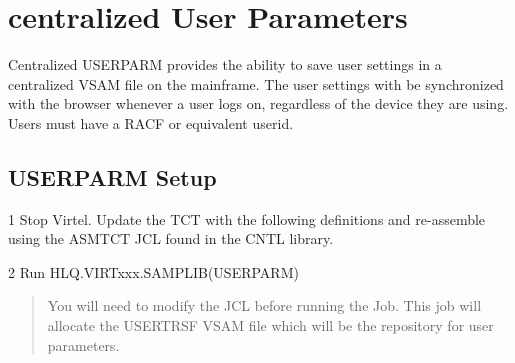 \documentclass[letterpaper,10pt,english]{sphinxmanual}
\begin{document}
\ignorespaces 

\chapter{centralized User Parameters}
\label{\detokenize{Customization:centralized-user-parameters}}\label{\detokenize{Customization:index-95}}
Centralized USERPARM provides the ability to save user settings in a centralized VSAM file on the mainframe. The user settings with be synchronized with the browser whenever a user logs on, regardless of the device they are using. Users must have a RACF or equivalent userid.


\section{USERPARM Setup}
\label{\detokenize{Customization:userparm-setup}}
1   Stop Virtel. Update the TCT with the following definitions and re-assemble using the ASMTCT JCL found in the CNTL library.
\begin{quote}

\begin{sphinxVerbatim}[commandchars=\\\{\}]
                                              
                                
            
\end{sphinxVerbatim}
\end{quote}

2   Run HLQ.VIRTxxx.SAMPLIB(USERPARM)
\begin{quote}

You will need to modify the JCL before running the Job. This job will allocate the USERTRSF VSAM file which will be the repository for user parameters.
\end{quote}
\end{document}
